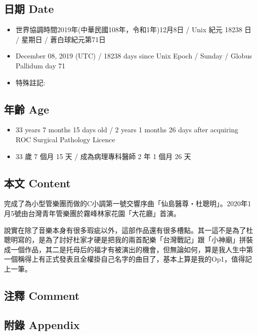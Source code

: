 \documentclass[
]{article}
\providecommand{\tightlist}{%
  \setlength{\itemsep}{0pt}\setlength{\parskip}{0pt}}
\begin{document}
\hypertarget{ux65e5ux671f-date-7}{%
\subsection{日期 Date}\label{ux65e5ux671f-date-7}}

\begin{itemize}
\tightlist
\item
  世界協調時間2019年(中華民國108年，令和1年)12月8日 / Unix 紀元 18238 日
  / 星期日 / 蒼白球紀元第71日
\item
  December 08, 2019 (UTC) / 18238 days since Unix Epoch / Sunday /
  Globus Pallidum day 71
\item
  特殊註記:
\end{itemize}

\hypertarget{ux5e74ux9f61-age-7}{%
\subsection{年齡 Age}\label{ux5e74ux9f61-age-7}}

\begin{itemize}
\tightlist
\item
  33 years 7 months 15 days old / 2 years 1 months 26 days after
  acquiring ROC Surgical Pathology Licence
\item
  33 歲 7 個月 15 天 / 成為病理專科醫師 2 年 1 個月 26 天
\end{itemize}

\hypertarget{ux672cux6587-content-7}{%
\subsection{本文 Content}\label{ux672cux6587-content-7}}

完成了為小型管樂團而做的C小調第一號交響序曲「仙島醫尊‧杜聰明」。2020年1月5號由台灣青年管樂團於霧峰林家花園「大花廳」首演。

說實在除了音樂本身有很多瑕疵以外，這部作品還有很多槽點。其一這不是為了杜聰明寫的，是為了討好杜家才硬是把我的兩首配樂「台灣戰記」跟「小神廟」拼裝成一個作品，其二是托母后的福才有被演出的機會，但無論如何，算是我人生中第一個稱得上有正式發表且全權掛自己名字的曲目了，基本上算是我的Op1，值得記上一筆。

\hypertarget{ux6ce8ux91cb-comment-7}{%
\subsection{注釋 Comment}\label{ux6ce8ux91cb-comment-7}}

\hypertarget{ux9644ux9304-appendix-7}{%
\subsection{附錄 Appendix}\label{ux9644ux9304-appendix-7}}
\end{document}
